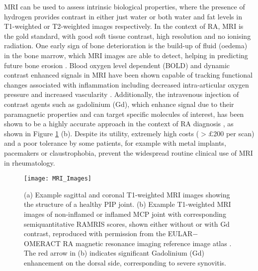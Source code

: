 \documentclass[twoside]{bhamthesis}
\theoremstyle{definition}
\begin{document}
MRI can be used to assess intrinsic biological properties, where the presence of hydrogen provides contrast in either just water or both water and fat levels in T1-weighted or T2-weighted images respectively. In the context of RA, MRI is the gold standard, with good soft tissue contrast, high resolution and no ionising radiation. One early sign of bone deterioration is the build-up of fluid (oedema) in the bone marrow, which MRI images are able to detect, helping in predicting future bone erosion \cite{sudol2013significance}. Blood oxygen level dependent (BOLD) and dynamic contrast enhanced signals in MRI have been shown capable of tracking functional changes associated with inflammation including decreased intra-articular oxygen pressure and increased vascularity \cite{chan2014systematic,Nasui2014}. Additionally, the intravenous injection of contrast agents such as gadolinium (Gd), which enhance signal due to their paramagnetic properties and can target specific molecules of interest, has been shown to be a highly accurate approach in the context of RA diagnosis \cite{hodgson2008mri}, as shown in Figure \ref{fig:MRI_Images} (b). Despite its utility, extremely high costs ($>\pounds$200 per scan) and a poor tolerance by some patients, for example with metal implants, pacemakers or claustrophobia, prevent the widespread routine clinical use of MRI in rheumatology.

\begin{figure}[!ht]
\centering\texttt{[image: MRI\_Images]}\caption[(a) Example sagittal and coronal T1-weighted MRI images showing the structure of a healthy PIP joint. (b) Example T1-weighted MRI images of non-inflamed or inflamed MCP joint with corresponding semiquantitative RAMRIS scores, shown either without or with Gd contrast, reproduced with permission from the EULAR OMERACT RA magnetic resonance imaging reference image atlas. The red arrow in (b) indicates significant Gd enhancement dorsal side, corresponding to severe synovitis.]{(a) Example sagittal and coronal T1-weighted MRI images showing the structure of a healthy PIP joint. (b) Example T1-weighted MRI images of non-inflamed or inflamed MCP joint with corresponding semiquantitative RAMRIS scores, shown either without or with Gd contrast, reproduced with permission from the EULAR$-$OMERACT RA magnetic resonance imaging reference image atlas \cite{conaghan2005eular}. The red arrow in (b) indicates significant Gadolinium (Gd) enhancement on the dorsal side, corresponding to severe synovitis.}
  \label{fig:MRI_Images}
\end{figure}
\end{document}
